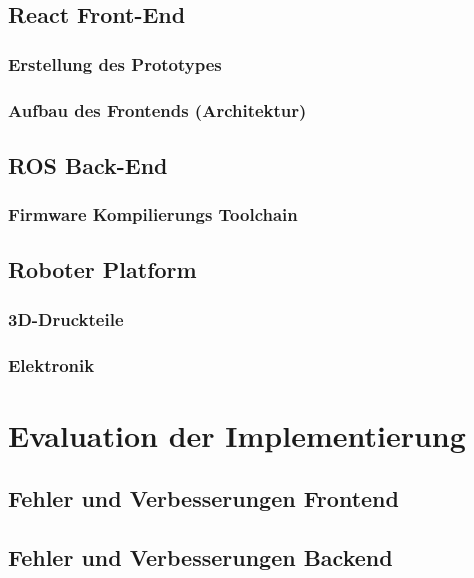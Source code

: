 \documentclass[11pt,oneside,a4paper,titlepage]{article}
\begin{document}
\subsection{React Front-End}

\subsubsection{Erstellung des Prototypes}


\subsubsection{Aufbau des Frontends (Architektur)}



\subsection{ROS Back-End}
\subsubsection{Firmware Kompilierungs Toolchain}



\pagebreak
\subsection{Roboter Platform}
\subsubsection{3D-Druckteile}


\subsubsection{Elektronik}


\section{Evaluation der Implementierung}

\subsection{Fehler und Verbesserungen Frontend}


\subsection{Fehler und Verbesserungen Backend}

\end{document}
